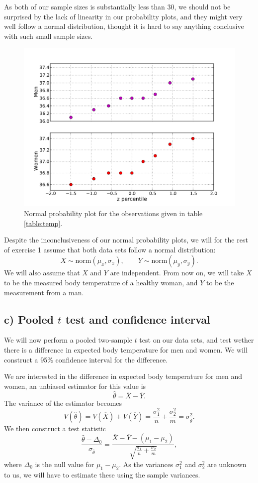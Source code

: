 \documentclass[a4paper, 11pt, titlepage]{article}
\begin{document}
As both of our sample sizes is substantially less than 30, we should not be surprised by the lack of linearity in our probability plots, and they might very well follow a normal distribution, thought it is hard to say anything conclusive with such small sample sizes.

\begin{figure}[htpb]
\centering
\includegraphics[width=\textwidth]{probabilityplot.pdf}
\caption{Normal probability plot for the observations given in table \ref{table:temp}. \label{fig:probplot}}
\end{figure}

\clearpage

Despite the inconclusiveness of our normal probability plots, we will for the rest of exercise 1 assume that both data sets follow a normal distribution:
$$X \sim \mbox{norm}(\mu_x, \sigma_x),\qquad Y \sim \mbox{norm}(\mu_y, \sigma_y).$$
We will also assume that $X$ and $Y$ are independent. From now on, we will take $X$ to be the measured body temperature of a healthy woman, and $Y$ to be the measurement from a man.

\subsection*{c) Pooled $t$ test and confidence interval}
We will now perform a pooled two-sample $t$ test on our data sets, and test wether there is a difference in expected body temperature for men and women. We will construct a 95\% confidence interval for the difference.

We are interested in the difference in expected body temperature for men and women, an unbiased estimator for this value is
$$\hat{\theta} = \overline{X} - \overline{Y}.$$
The variance of the estimator becomes
$$V(\hat{\theta}) = V(\overline{X}) + V(\overline{Y}) = \frac{\sigma_1^2}{n} + \frac{\sigma_2^2}{m} = \sigma_{\hat{\theta}}^2.$$
We then construct a test statistic 
$$\frac{\hat{\theta} - \Delta_0}{\sigma_{\hat{\theta}}} = \frac{\overline{X} - \overline{Y} - (\mu_1 - \mu_2)}{\sqrt{\frac{\sigma_1}{n} + \frac{\sigma_2}{m}}},$$
where $\Delta_0$ is the null value for $\mu_1 - \mu_2$. As the variances $\sigma_1^2$ and $\sigma_2^2$ are unknown to us, we will have to estimate these using the sample variances. 
\end{document}
